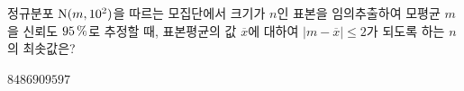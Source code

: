 정규분포 $\mathrm{N}(m{,}\mkern3mu\mathopen{}10^2)$을 따르는 모집단에서 크기가 $n$인 표본을 임의추출하여 모평균 $m$을 신뢰도 $95\mkern3mu \%$로 추정할 때, 표본평균의 값 $\overline{x}$에 대하여 $|m-\overline{x}|\le 2$가 되도록 하는 $n$의 최솟값은? 
\begin{choices32}{$84$}{$86$}{$90$}{$95$}{$97$}\end{choices32}
